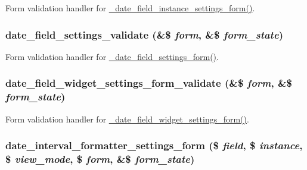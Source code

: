 \label{date__admin_8inc_a4a30fe673c9a4249ac93668b8c9e7bdc}
Form validation handler for \hyperlink{date__admin_8inc_a2492af6b02e01e06c8efea31650b1bc2}{\_\-date\_\-field\_\-instance\_\-settings\_\-form()}. \hypertarget{date__admin_8inc_a6a824eba39c878d75f07f6ae4d585b36}{
\subsubsection[{date\_\-field\_\-settings\_\-validate}]{\setlength{\rightskip}{0pt plus 5cm}date\_\-field\_\-settings\_\-validate (\&\$ {\em form}, \/  \&\$ {\em form\_\-state})}}
\label{date__admin_8inc_a6a824eba39c878d75f07f6ae4d585b36}
Form validation handler for \hyperlink{date__admin_8inc_a093c2cd636fa311d4a0bf44d398f822f}{\_\-date\_\-field\_\-settings\_\-form()}. \hypertarget{date__admin_8inc_a20ea5e4f157140ba68146345059d7a36}{
\subsubsection[{date\_\-field\_\-widget\_\-settings\_\-form\_\-validate}]{\setlength{\rightskip}{0pt plus 5cm}date\_\-field\_\-widget\_\-settings\_\-form\_\-validate (\&\$ {\em form}, \/  \&\$ {\em form\_\-state})}}
\label{date__admin_8inc_a20ea5e4f157140ba68146345059d7a36}
Form validation handler for \hyperlink{date__admin_8inc_a794106e9989d98e7ed83b325186a7f1c}{\_\-date\_\-field\_\-widget\_\-settings\_\-form()}. \hypertarget{date__admin_8inc_a5dee3173cbdd9a679fb2820e328d1bda}{
\subsubsection[{date\_\-interval\_\-formatter\_\-settings\_\-form}]{\setlength{\rightskip}{0pt plus 5cm}date\_\-interval\_\-formatter\_\-settings\_\-form (\$ {\em field}, \/  \$ {\em instance}, \/  \$ {\em view\_\-mode}, \/  \$ {\em form}, \/  \&\$ {\em form\_\-state})}}
